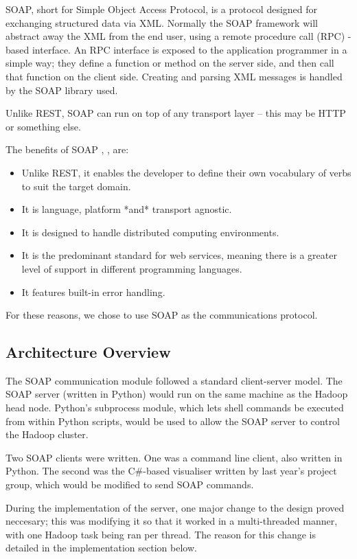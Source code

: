 SOAP, short for Simple Object Access Protocol, is a protocol designed for exchanging structured data via XML. Normally the SOAP framework will abstract away the XML from the end user, using a remote procedure call (RPC) -based interface. An RPC interface is exposed to the application programmer in a simple way; they define a function or method on the server side, and then call that function on the client side. Creating and parsing XML messages is handled by the SOAP library used.

Unlike REST, SOAP can run on top of any transport layer -- this may be HTTP or something else.

The benefits of SOAP \cite{infoq}, \cite{ajoxonomy}, are:
\begin{itemize}
\item Unlike REST, it enables the developer to define their own vocabulary of
verbs to suit the target domain.
\item It is language, platform *and* transport agnostic.
\item It is designed to handle distributed computing environments.
\item It is the predominant standard for web services, meaning there is a
greater level of support in different programming languages.
\item It features built-in error handling.
\end{itemize}

For these reasons, we chose to use SOAP as the communications protocol.

\subsection{Architecture Overview}

The SOAP communication module followed a standard client-server model. The SOAP server (written in Python) would run on the same machine as the Hadoop head node. Python's subprocess module, which lets shell commands be executed from within Python scripts, would be used to allow the SOAP server to control the Hadoop cluster.

Two SOAP clients were written. One was a command line client, also written in Python. The second was the C\#-based visualiser written by last year's project group, which would be modified to send SOAP commands.

During the implementation of the server, one major change to the design proved neccesary; this was modifying it so that it worked in a multi-threaded manner, with one Hadoop task being ran per thread. The reason for this change is detailed in the implementation section below.

